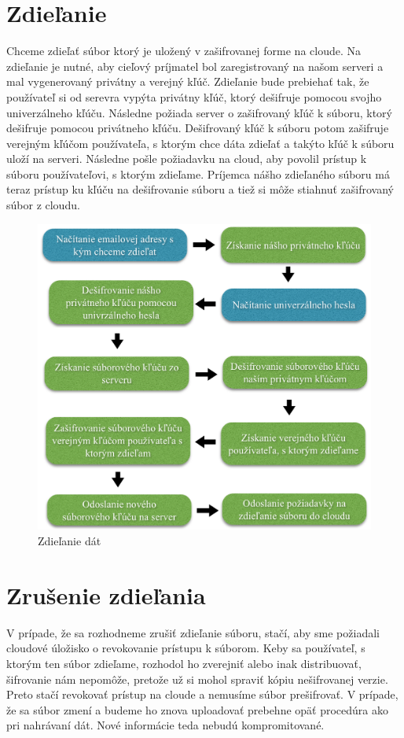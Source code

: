 	\section{Zdieľanie}
	
		Chceme zdieľať súbor ktorý je uložený v zašifrovanej forme na cloude. Na zdieľanie je nutné, aby cieľový príjmatel bol zaregistrovaný na našom serveri a mal vygenerovaný privátny a verejný kľúč. Zdieľanie bude prebiehať tak, že používateľ si od serevra vypýta privátny kľúč, ktorý dešifruje pomocou svojho univerzálneho kľúču. Následne požiada server o zašifrovaný kľúč k súboru, ktorý dešifruje pomocou privátneho kľúču. Dešifrovaný kľúč k súboru potom zašifruje verejným kľúčom používateľa, s ktorým chce dáta zdieľať a takýto kľúč k súboru uloží na serveri. Následne pošle požiadavku na cloud, aby povolil prístup k súboru používateľovi, s ktorým zdieľame. Príjemca nášho zdieľaného súboru má teraz prístup ku kľúču na dešifrovanie súboru a tiež si môže stiahnuť zašifrovaný súbor z cloudu.
		
		\begin{figure}[H]
			\begin{center}
				\includegraphics[width=1\linewidth]{images/zdielanie.png}
				\caption{Zdieľanie dát}
			\end{center}
		\end{figure}
		
	\section{Zrušenie zdieľania}
	
		V prípade, že sa rozhodneme zrušiť zdieľanie súboru, stačí, aby sme požiadali cloudové úložisko o revokovanie prístupu k súborom. Keby sa používateľ, s ktorým ten súbor zdieľame, rozhodol ho zverejniť alebo inak distribuovať, šifrovanie nám nepomôže, pretože už si mohol spraviť kópiu nešifrovanej verzie. Preto stačí revokovať prístup na cloude a nemusíme súbor prešifrovať. V prípade, že sa súbor zmení a budeme ho znova uploadovať prebehne opäť procedúra ako pri nahrávaní dát. Nové informácie teda nebudú kompromitované.
	